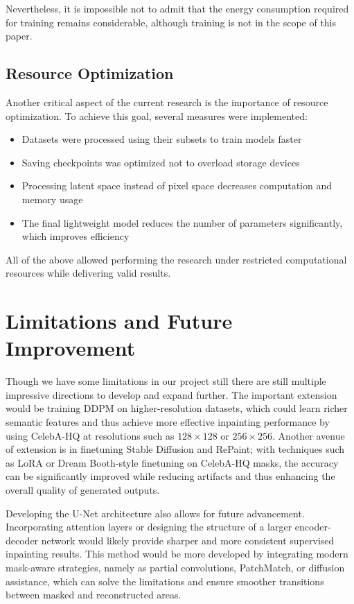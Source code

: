 \documentclass[journal]{IEEEtran}
\begin{document}
Nevertheless, it is impossible not to admit that the energy consumption required for training remains considerable, although training is not in the scope of this paper.

\subsection{Resource Optimization}
Another critical aspect of the current research is the importance of resource optimization. To achieve this goal, several measures were implemented:
\begin{itemize}
  \item Datasets were processed using their subsets to train models faster
  \item Saving checkpoints was optimized not to overload storage devices
  \item Processing latent space instead of pixel space decreases computation and memory usage
  \item The final lightweight model reduces the number of parameters significantly, which improves efficiency
\end{itemize}
All of the above allowed performing the research under restricted computational resources while delivering valid results.

\section{Limitations and Future Improvement}
Though we have some limitations in our project still there are still multiple impressive directions to develop and expand further. The important extension would be training DDPM on higher-resolution datasets, which could learn richer semantic features and thus achieve more effective inpainting performance by using CelebA-HQ at resolutions such as $128\times128$ or $256\times256$. Another avenue of extension is in finetuning Stable Diffusion and RePaint; with techniques such as LoRA or Dream Booth-style finetuning on CelebA-HQ masks, the accuracy can be significantly improved while reducing artifacts and thus enhancing the overall quality of generated outputs.

Developing the U-Net architecture also allows for future advancement. Incorporating attention layers or designing the structure of a larger encoder-decoder network would likely provide sharper and more consistent supervised inpainting results. This method would be more developed by integrating modern mask-aware strategies, namely as partial convolutions, PatchMatch, or diffusion assistance, which can solve the limitations and ensure smoother transitions between masked and reconstructed areas.
\end{document}
